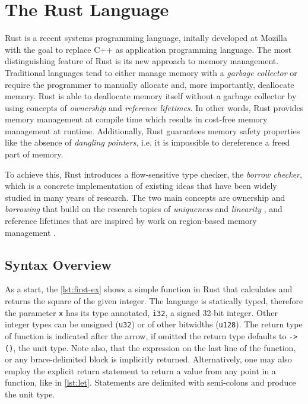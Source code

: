 \section{The Rust Language}

Rust \cite{rust2, rust1} is a recent systems programming language, initally
developed at Mozilla with the goal to replace C++ as application programming
language. The most distinguishing feature of Rust is its new approach to memory
management. Traditional languages tend to either manage memory with a
\emph{garbage collector} or require the programmer to manually allocate and,
more importantly, deallocate memory. Rust is able to deallocate memory itself
without a garbage collector by using concepts of \emph{ownership} and
\emph{reference lifetimes}. In other words, Rust provides memory management at
compile time which results in cost-free memory management at runtime.
Additionally, Rust guarantees memory safety properties like  the absence of
\emph{dangling pointers}, i.e. it is impossible to dereference a freed part of
memory.

To achieve this, Rust introduces a flow-sensitive type checker, the \emph{borrow
checker}, which is a concrete implementation of existing ideas that have been
widely studied in many years of research. The two main concepts are ownership
\cite{ownership-types} and \emph{borrowing} that build on the research topics of
\emph{uniqueness} \cite{external-uniqueness, alias-burying} and \emph{linearity}
\cite{Wadler90lineartypes, once-upon-a-type, linear-haskell}, and reference
lifetimes that are inspired by work on region-based memory management
\cite{cyclone-region}.


\subsection{Syntax Overview}

As a start, the \autoref{lst:first-ex} shows a simple function in Rust that
calculates and returns the square of the given integer. The language is
statically typed, therefore the parameter \lstinline!x! has its type annotated,
\lstinline!i32!, a signed 32-bit integer. Other integer types can be unsigned
(\lstinline!u32!) or of other bitwidths (\lstinline!u128!). The return type of
function is indicated after the arrow, if omitted the return type defaults to
\lstinline!-> ()!, the unit type. Note also, that the expression on the last
line of the function, or any brace-delimited block is implicitly returned.
Alternatively, one may also employ the explicit return statement to return a
value from any point in a function, like in \autoref{lst:let}. Statements
are delimited with semi-colons and produce the unit type.

